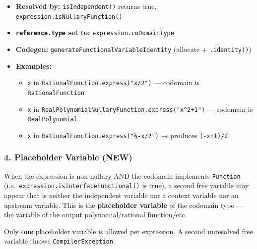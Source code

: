 \documentclass[
]{article}
\providecommand{\tightlist}{%
  \setlength{\itemsep}{0pt}\setlength{\parskip}{0pt}}
\begin{document}
\begin{itemize}
\tightlist
\item
  \textbf{Resolved by:} \texttt{isIndependent()} returns true,
  \texttt{expression.isNullaryFunction()}
\item
  \textbf{\texttt{reference.type} set to:}
  \texttt{expression.coDomainType}
\item
  \textbf{Codegen:} \texttt{generateFunctionalVariableIdentity}
  (allocate + \texttt{.identity()})
\item
  \textbf{Examples:}

  \begin{itemize}
  \tightlist
  \item
    \texttt{x} in \texttt{RationalFunction.express("x/2")} --- codomain
    is \texttt{RationalFunction}
  \item
    \texttt{x} in
    \texttt{RealPolynomialNullaryFunction.express("x\^{}2+1")} ---
    codomain is \texttt{RealPolynomial}
  \item
    \texttt{x} in \texttt{RationalFunction.express("½-x/2")} → produces
    \texttt{(-x+1)/2}
  \end{itemize}
\end{itemize}

\subsubsection{4. Placeholder Variable
(NEW)}\label{placeholder-variable-new}

When the expression is non-nullary AND the codomain implements
\texttt{Function} (i.e.~\texttt{expression.isInterfaceFunctional()} is
true), a second free variable may appear that is neither the independent
variable nor a context variable nor an upstream variable. This is the
\textbf{placeholder variable} of the codomain type --- the variable of
the output polynomial/rational function/etc.

Only \textbf{one} placeholder variable is allowed per expression. A
second unresolved free variable throws \texttt{CompilerException}.
\end{document}
